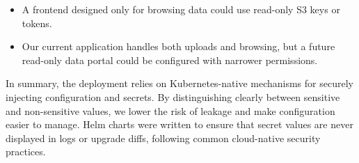 \begin{itemize}
	\item A frontend designed only for browsing data could use read-only S3 keys or tokens.  
	\item Our current application handles both uploads and browsing, but a future read-only data portal could be configured with narrower permissions.  
\end{itemize}

\medskip

In summary, the deployment relies on Kubernetes-native mechanisms for securely injecting configuration and secrets. By distinguishing clearly between sensitive and non-sensitive values, we lower the risk of leakage and make configuration easier to manage. Helm charts were written to ensure that secret values are never displayed in logs or upgrade diffs, following common cloud-native security practices.
